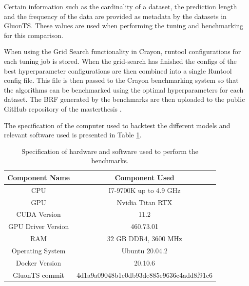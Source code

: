 Certain information such as the cardinality of a dataset, the prediction length and the frequency of the data are provided as metadata by the datasets in GluonTS. These values are used when performing the tuning and benchmarking for this comparison.

When using the Grid Search functionality in Crayon, runtool configurations for each tuning job is stored. When the grid-search has finished the configs of the best hyperparameter configurations are then combined into a single Runtool config file. This file is then passed to the Crayon benchmarking system so that the algorithms can be benchmarked using the optimal hyperparameters for each dataset. The BRF generated by the benchmarks are then uploaded to the public GitHub repository of the masterthesis \cite{}.

The specification of the computer used to backtest the different models and relevant software used is presented in Table \ref{tab:sys_spec}.

\begin{table}[htb]
    \centering
    \begin{tabular}{cc}
        \hline
        Component Name     & Component Used                           \\[0.5ex]
        \hline
        CPU                & I7-9700K up to 4.9 GHz                   \\
        GPU                & Nvidia Titan RTX                         \\
        CUDA Version       & 11.2                                     \\
        GPU Driver Version & 460.73.01                                \\
        RAM                & 32 GB DDR4, 3600 MHz                     \\
        Operating System   & Ubuntu 20.04.2                           \\
        Docker Version     & 20.10.6                                  \\
        GluonTS commit     & 4d1a9a09048b1e0db93de885e9636e4add8f91c6 \\
    \end{tabular}
    \caption{Specification of hardware and software used to perform the benchmarks.}
    \label{tab:sys_spec}
\end{table}

